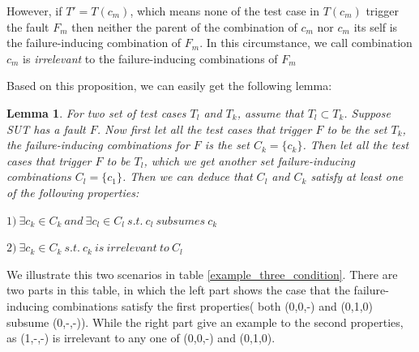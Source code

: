 \documentclass{sig-alternate}
\begin{document}
However, if $T' = T(c_{m})$, which means none of the test case in $T(c_{m})$ trigger the fault $F_{m}$ then neither the parent of the combination of $c_{m}$ nor $c_{m}$ its self is the failure-inducing combination of $F_{m}$. In this circumstance, we call combination $c_{m}$ is \emph{irrelevant} to the failure-inducing combinations of $F_{m}$


Based on this proposition, we can easily get the following lemma:

\newtheorem{lemma}{Lemma}
\begin{lemma}
For two set of test cases $T_{l}$ and $T_{k}$, assume that $T_{l} \subset T_{k}$. Suppose SUT has a  fault $F$. Now first let all the test cases that trigger $F$ to be the set $T_{k}$, the failure-inducing combinations for $F$ is the set $C_{k}= \{ c_{k}\}$. Then let all the test cases that trigger $F$ to be $T_{l}$, which we get another set failure-inducing combinations $C_{l} = \{ c_{1} \}$. Then we can deduce that $C_{l}$ and $C_{k}$ satisfy at least one of the following properties:

$ 1)\ \exists c_{k} \in C_{k}\ and\ \exists c_{l} \in C_{l} \ s.t.\ c_{l}\ subsumes\ c_{k}  $

$2)\ \exists c_{k} \in C_{k}\ s.t.\ c_{k}\ is\ irrelevant\ to\ C_{l} $

\end{lemma}

We illustrate this two scenarios in table \ref{example_three_condition}. There are two parts in this table, in which the left part shows the case that the failure-inducing combinations satisfy the first properties( both (0,0,-) and (0,1,0) subsume (0,-,-)). While the right part give an example to the second properties, as (1,-,-) is irrelevant to any one of (0,0,-) and (0,1,0).

%
\end{document}
